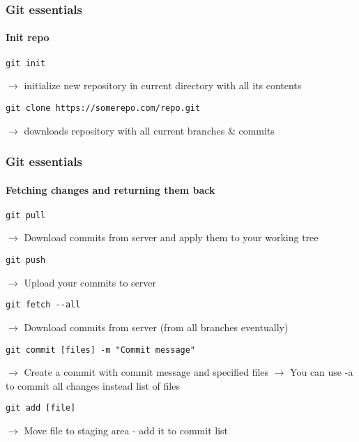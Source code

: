 \documentclass[aspectratio=169]{beamer}
\begin{document}
    \begin{frame}[fragile]
        \frametitle{Git essentials}
        \framesubtitle{Init repo}
        \begin{lstlisting}[gobble=12]
            git init
        \end{lstlisting}
        $\rightarrow$ initialize new repository in current directory with all its contents
        \begin{lstlisting}[gobble=12]
            git clone https://somerepo.com/repo.git
        \end{lstlisting}
        $\rightarrow$ downloads repository with all current branches \& commits
    \end{frame}
    \begin{frame}[fragile]
        \frametitle{Git essentials}
        \framesubtitle{Fetching changes and returning them back}
        \begin{lstlisting}[gobble=12]
            git pull
        \end{lstlisting}
        $\rightarrow$ Download commits from server and apply them to your working tree
        \begin{lstlisting}[gobble=12]
            git push
        \end{lstlisting}
        $\rightarrow$ Upload your commits to server
        \begin{lstlisting}[gobble=12]
            git fetch --all
        \end{lstlisting}
        $\rightarrow$ Download commits from server (from all branches eventually)
        \begin{lstlisting}[gobble=12]
            git commit [files] -m "Commit message"
        \end{lstlisting}
        $\rightarrow$ Create a commit with commit message and specified files\newline
        $\rightarrow$ You can use -a to commit all changes instead list of files
        \begin{lstlisting}[gobble=12]
            git add [file]
        \end{lstlisting}
        $\rightarrow$ Move file to staging area - add it to commit list
    \end{frame}
\end{document}
